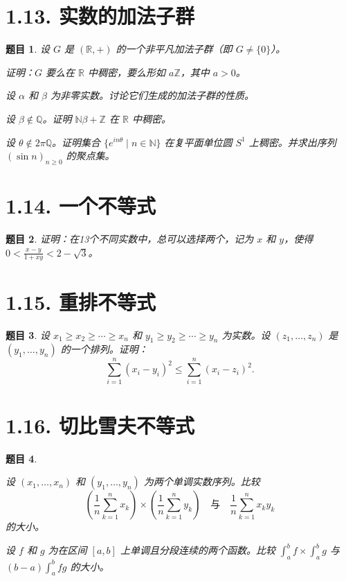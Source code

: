 \documentclass[12pt,UTF8]{ctexbook}
\theoremstyle{exercisestyle}
\newtheorem*{exercise}{题目}
\theoremstyle{solutionstyle}
\begin{document}
\section{1.13. 实数的加法子群}
\begin{exercise}
  设 \(G\) 是 \((\mathbb{R}, +)\) 的一个非平凡加法子群（即 \(G \neq \{0\}\)）。  
  \begin{subquestions}
    \item 证明：\(G\) 要么在 \(\mathbb{R}\) 中稠密，要么形如 \(a\mathbb{Z}\)，其中 \(a > 0\)。
    \item 设 \(\alpha\) 和 \(\beta\) 为非零实数。讨论它们生成的加法子群的性质。
    \item 设 \(\beta \notin \mathbb{Q}\)。证明 \(\mathbb{N}\beta + \mathbb{Z}\) 在 \(\mathbb{R}\) 中稠密。
    \item 设 \(\theta \notin 2\pi\mathbb{Q}\)。证明集合 \(\{e^{in\theta} \mid n \in \mathbb{N}\}\) 在复平面单位圆 \(S^1\) 上稠密。并求出序列 \((\sin n)_{n\geqslant 0}\) 的聚点集。
  \end{subquestions}
\end{exercise}

\section{1.14. 一个不等式}
\begin{exercise}
  证明：在13个不同实数中，总可以选择两个，记为 \(x\) 和 \(y\)，使得 \(0 < \frac{x-y}{1+xy} < 2-\sqrt{3}\)。
\end{exercise}

\section{1.15. 重排不等式}
\begin{exercise}
设 \(x_1 \geqslant x_2 \geqslant \cdots \geqslant x_n\) 和 \(y_1 \geqslant y_2 \geqslant \cdots \geqslant y_n\) 为实数。设 \((z_1, \ldots, z_n)\) 是 \((y_1, \ldots, y_n)\) 的一个排列。证明：
\[
\sum_{i=1}^{n} (x_i - y_i)^2 \leqslant \sum_{i=1}^{n} (x_i - z_i)^2.
\]
\end{exercise}

\section{1.16. 切比雪夫不等式}
\begin{exercise}
  \begin{subquestions}
    \item 设 \((x_1, \ldots, x_n)\) 和 \((y_1, \ldots, y_n)\) 为两个单调实数序列。比较
    \[
    \left(\frac{1}{n}\sum_{k=1}^n x_k\right) \times \left(\frac{1}{n}\sum_{k=1}^n y_k\right)
    \quad \mbox{与} \quad 
    \frac{1}{n}\sum_{k=1}^n x_k y_k
    \]
    的大小。
    \item 设 \(f\) 和 \(g\) 为在区间 \([a, b]\) 上单调且分段连续的两个函数。比较 \(\int_a^b f \times \int_a^b g\) 与 \((b-a) \int_a^b fg\) 的大小。
  \end{subquestions}
\end{exercise}
\end{document}
